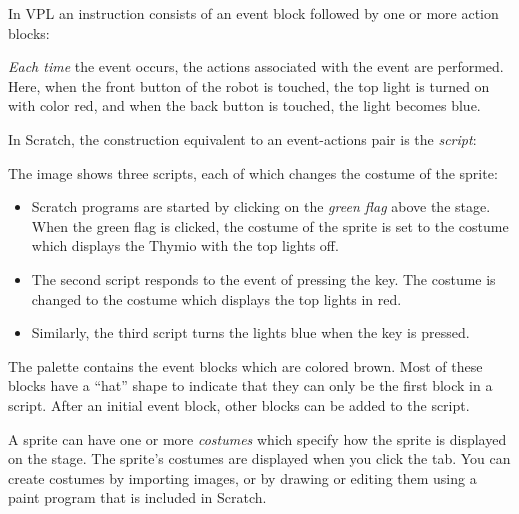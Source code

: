 \label{ch.events}



In VPL an instruction consists of an event block followed by one or
more action blocks:


\emph{Each time} the event occurs, the actions associated with the event
are performed. Here, when the front button of the robot is touched, the
top light is turned on with color red, and when the back button is
touched, the light becomes blue.

In Scratch, the construction equivalent to an event-actions pair is the
\emph{script}:


The image shows three scripts, each of which changes the costume of the
sprite:

\begin{itemize}

\item Scratch programs are started by clicking on the \emph{green flag}
above the stage. When the green flag is clicked, the costume of the
sprite is set to the  costume which displays the Thymio with
the top lights off.

\item The second script responds to the event of pressing the 
key. The costume is changed to the  costume which displays the
top lights in red.

\item Similarly, the third script turns the lights blue when the 
key is pressed.

\end{itemize}

The  palette contains the event blocks which are colored
brown. Most of these blocks have a ``hat'' shape to indicate that they
can only be the first block in a script. After an initial event block,
other blocks can be added to the script.



A sprite can have one or more \emph{costumes} which specify how the
sprite is displayed on the stage. The sprite's costumes are displayed
when you click the  tab. You can create costumes by
importing images, or by drawing or editing them using a paint program
that is included in Scratch.


